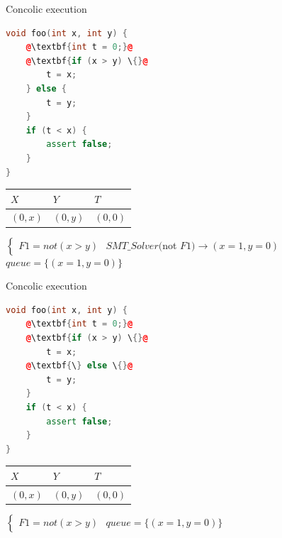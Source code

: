 \documentclass{beamer}
\begin{document}
\begin{frame}[fragile]{Concolic execution}
\begin{minipage}{0.49\textwidth}
\begin{lstlisting}[language=C++,escapechar=@]
void foo(int x, int y) {
    @\textbf{int t = 0;}@
    @\textbf{if (x > y) \{}@
        t = x;
    } else {
        t = y;
    }
    if (t < x) {
        assert false;
    }
}
\end{lstlisting}
\end{minipage}
\hfill
\begin{minipage}{0.49\textwidth}
\begin{center}
\begin{tabular}{ | l | l | l | }
\hline
$X$ & $Y$ & $T$ \\
\hline
$(0, x)$ & $(0, y)$ & $(0, 0)$ \\
\hline
\end{tabular}
$\left\{
\begin{array}{l}
F1 = not (x > y)
\end{array}
\right.$
$SMT\_Solver($not $F1) \to (x = 1, y = 0)$
$queue = \{(x = 1, y = 0)\}$
\end{center}
\end{minipage}
\end{frame}

\begin{frame}[fragile]{Concolic execution}
\begin{minipage}{0.49\textwidth}
\begin{lstlisting}[language=C++,escapechar=@]
void foo(int x, int y) {
    @\textbf{int t = 0;}@
    @\textbf{if (x > y) \{}@
        t = x;
    @\textbf{\} else \{}@
        t = y;
    }
    if (t < x) {
        assert false;
    }
}
\end{lstlisting}
\end{minipage}
\hfill
\begin{minipage}{0.49\textwidth}
\begin{center}
\begin{tabular}{ | l | l | l | }
\hline
$X$ & $Y$ & $T$ \\
\hline
$(0, x)$ & $(0, y)$ & $(0, 0)$ \\
\hline
\end{tabular}
$\left\{
\begin{array}{l}
F1 = not (x > y)
\end{array}
\right.$
$queue = \{(x = 1, y = 0)\}$
\end{center}
\end{minipage}
\end{frame}
\end{document}
